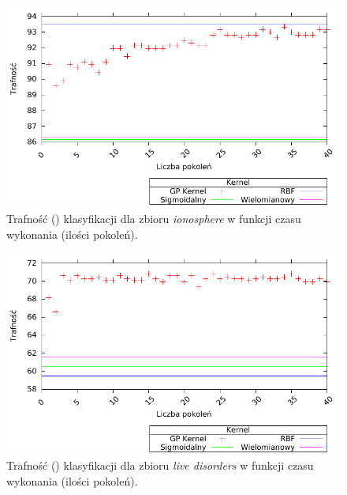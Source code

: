 	\begin{figure}
		\includegraphics[scale=0.90]{figures/results/accuracy/accuracy-ionosphere}
		\caption{Trafność () klasyfikacji dla zbioru \emph{ionosphere} w funkcji czasu wykonania (ilości pokoleń).\label{fig:acc-ionosphere}}
	\end{figure}
	
	\begin{figure}
		\includegraphics[scale=0.90]{figures/results/accuracy/accuracy-liver-disorders}
		\caption{Trafność () klasyfikacji dla zbioru \emph{live disorders} w funkcji czasu wykonania (ilości pokoleń).\label{fig:acc-liver}}
	\end{figure}
		
